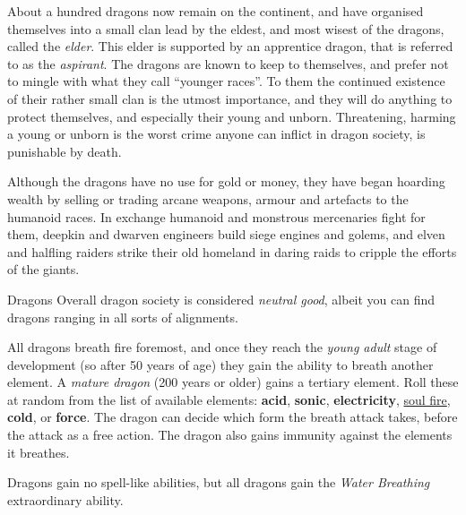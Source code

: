 About a hundred dragons now remain on the continent, and have organised
themselves into a small clan lead by the eldest, and most wisest of the
dragons, called the \emph{elder}. This elder is supported by an apprentice
dragon, that is referred to as the \emph{aspirant}. The dragons are known to
keep to themselves, and prefer not to mingle with what they call ``younger
races''. To them the continued existence of their rather small clan is the
utmost importance, and they will do anything to protect themselves, and
especially their young and unborn. Threatening, harming a young or unborn is
the worst crime anyone can inflict in dragon society, is punishable by death.

Although the dragons have no use for gold or money, they have began hoarding
wealth by selling or trading arcane weapons, armour and artefacts to the
humanoid races. In exchange humanoid and monstrous mercenaries fight for them,
deepkin and dwarven engineers build siege engines and golems, and elven and
halfling raiders strike their old homeland in daring raids to cripple the
efforts of the giants.

\begin{35e}{Dragons}
  Overall dragon society is considered \emph{neutral good}, albeit you can
  find dragons ranging in all sorts of alignments.

  All dragons breath fire foremost, and once they reach the \emph{young adult}
  stage of development (so after 50 years of age) they gain the ability to
  breath another element. A \emph{mature dragon} (200 years or older) gains a
  tertiary element. Roll these at random from the list of available elements:
  \textbf{acid}, \textbf{sonic}, \textbf{electricity}, \hyperref[sec:Soul
    Fire]{soul fire}, \textbf{cold}, or \textbf{force}. The dragon can decide
  which form the breath attack takes, before the attack as a free action. The
  dragon also gains immunity against the elements it breathes.

  Dragons gain no spell-like abilities, but all dragons gain the
  \emph{Water Breathing} extraordinary ability.
\end{35e}
